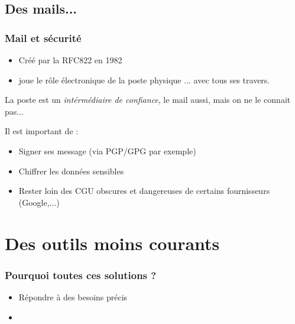 \documentclass{beamer}
\begin{document}
\subsection{Des mails...} %

\begin{frame}
    \frametitle{Mail et sécurité}

    \begin{itemize}
        \item Créé par la RFC822 en 1982
        \item joue le rôle électronique de la poste physique ... avec tous ses travers.
    \end{itemize}

    \pause{}
    
    La poste est un \textit{intérmédiaire de confiance}, le mail aussi, mais on ne le connait pas...

    \pause{}

    Il est important de :

    \begin{itemize}
        \item Signer ses message (via PGP/GPG par exemple)
        \item Chiffrer les données sensibles
        \item Rester loin des CGU obscures et dangereuses de certains fournisseurs (Google,...)
    \end{itemize}
\end{frame}

\section{Des outils moins courants} %

\begin{frame}
    \frametitle{Pourquoi toutes ces solutions ?}

    \begin{itemize}
        \item Répondre à des besoins précis
        \item
    \end{itemize}
\end{frame}

\end{document}
